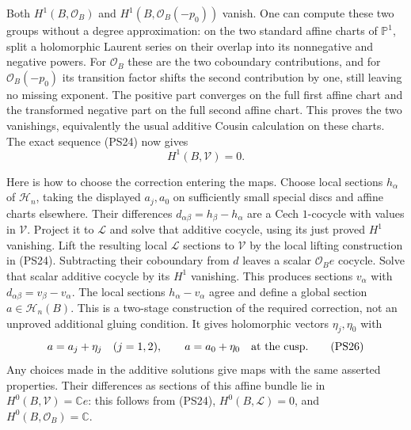 Both $H^1(B,\mathcal O_B)$ and
$H^1(B,\mathcal O_B(-p_0))$ vanish. One can compute these two
groups without a degree approximation: on the two standard affine
charts of $\mathbb P^1$, split a holomorphic Laurent series on
their overlap into its nonnegative and negative powers. For
$\mathcal O_B$ these are the two coboundary contributions, and
for $\mathcal O_B(-p_0)$ its transition factor shifts the second
contribution by one, still leaving no missing exponent. The positive
part converges on the full first affine chart and the transformed
negative part on the full second affine chart. This proves the two
vanishings, equivalently the usual additive Cousin calculation on
these charts. The exact sequence (PS24) now gives
\[
                             H^1(B,\mathscr V)=0.
 \tag{PS25}\label{wb:pshift:eq:no-analytic-obstruction}
\]

Here is how to choose the correction entering the maps. Choose
local sections $h_\alpha$ of $\mathscr H_n$, taking the displayed
$a_j,a_0$ on sufficiently small special discs and affine charts
elsewhere. Their differences $d_{\alpha\beta}=h_\beta-h_\alpha$
are a Cech $1$-cocycle with values in $\mathscr V$. Project it to
$\mathcal L$ and solve that additive cocycle, using its just proved
$H^1$ vanishing. Lift the resulting local $\mathcal L$ sections to
$\mathscr V$ by the local lifting construction in (PS24). Subtracting
their coboundary from $d$ leaves a scalar $\mathcal O_Be$ cocycle.
Solve that scalar additive cocycle by its $H^1$ vanishing. This
produces sections $v_\alpha$ with
$d_{\alpha\beta}=v_\beta-v_\alpha$. The local sections
$h_\alpha-v_\alpha$ agree and define a global section
$a\in\mathscr H_n(B)$. This is a two-stage construction of the
required correction, not an unproved additional gluing condition.
It gives holomorphic vectors $\eta_j,\eta_0$ with
\[
 a=a_j+\eta_j\quad(j=1,2),\qquad a=a_0+\eta_0
                              \quad\hbox{at the cusp}.
 \tag{PS26}\label{wb:pshift:eq:global-correction}
\]
Any choices made in the additive solutions give maps with the same
asserted properties. Their differences as sections of this affine
bundle lie in $H^0(B,\mathscr V)=\mathbb C e$: this follows from
(PS24), $H^0(B,\mathcal L)=0$, and $H^0(B,\mathcal O_B)=\mathbb C$.

